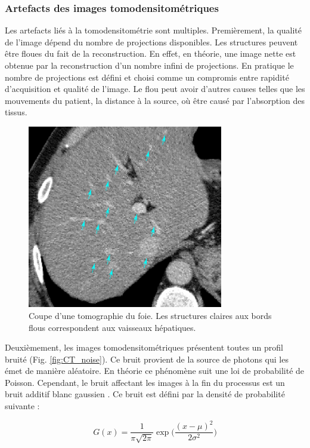 \subsubsection{Artefacts des images tomodensitométriques}

Les artefacts liés à la tomodensitométrie sont multiples. Premièrement, la qualité de l'image dépend du nombre de projections disponibles. Les structures peuvent être floues du fait de la reconstruction. En effet, en théorie, une image nette est obtenue par la reconstruction d'un nombre infini de projections. En pratique le nombre de projections est défini et choisi comme un compromis entre rapidité d'acquisition et qualité de l'image. Le flou peut avoir d'autres causes telles que les mouvements du patient, la distance à la source, où être causé par l'absorption des tissus. 

\begin{figure}
    \centering
    \includegraphics[height=8cm]{Images/blury_vessels_arrow.png}
    \caption{Coupe d'une tomographie du foie. Les structures claires aux bords flous  correspondent aux vaisseaux hépatiques.}
    \label{fig:CT_blur}
\end{figure}

Deuxièmement, les images tomodensitométriques présentent toutes un profil bruité (Fig. \ref{fig:CT_noise}). Ce bruit provient de la source de photons qui les émet de manière aléatoire. En théorie ce phénomène suit une loi de probabilité de Poisson. Cependant, le bruit affectant les images à la fin du processus est un bruit additif blanc gaussien \cite{Lei1992_gaussianNoiseCT}. Ce bruit est défini par la densité de probabilité suivante :

\begin{equation}
G(x) = \frac{1}{\pi \sqrt{2\pi} } \exp\big( \frac{ (x-\mu)^2}{2\sigma^2} )    
\end{equation}

